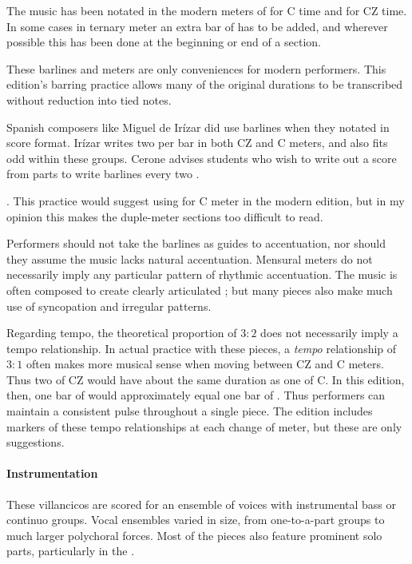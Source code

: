 The music has been notated in the modern meters of  for C time and  for CZ time.
In some cases in ternary meter an extra bar of  has to be added, and wherever possible this has been done at the beginning or end of a section.

These barlines and meters are only conveniences for modern performers.
This edition's barring practice allows many of the original durations to be transcribed without reduction into tied notes.

Spanish composers like Miguel de Irízar did use barlines when they notated in score format.
Irízar writes two  per bar in both CZ and C meters, and also fits odd  within these groups.
Cerone advises students who wish to write out a score from parts to write barlines every two .%
  \begin{Footnote}
  \autocite[745]{Cerone:Melopeo}.
  This practice would suggest using  for C meter in the modern edition, but in my opinion this makes the duple-meter sections too difficult to read.
  \end{Footnote}

Performers should not take the barlines as guides to accentuation, nor should they assume the music lacks natural accentuation.
Mensural meters do not necessarily imply any particular pattern of rhythmic accentuation.
The music is often composed to create clearly articulated ; but many pieces also make much use of syncopation and irregular patterns.

Regarding tempo, the theoretical proportion of $3:2$ does not necessarily imply a tempo relationship.
In actual practice with these pieces, a \emph{tempo} relationship of $3:1$ often makes more musical sense when moving between CZ and C meters.
Thus two  of CZ would have about the same duration as one  of C.
In this edition, then, one bar of  would approximately equal one bar of .
Thus performers can maintain a consistent pulse throughout a single piece.
The edition includes markers of these tempo relationships at each change of meter, but these are only suggestions.

\paragraph{Instrumentation}

These villancicos are scored for an ensemble of voices with instrumental bass or continuo groups.
Vocal ensembles varied in size, from one-to-a-part groups to much larger polychoral forces.
Most of the pieces also feature prominent solo parts, particularly in the .


